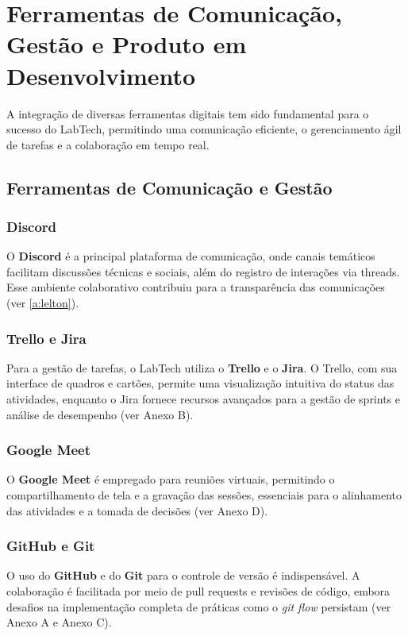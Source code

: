 
\chapter{Ferramentas de Comunicação, Gestão e Produto em Desenvolvimento}
\label{chap:ferramentas_produto}

A integração de diversas ferramentas digitais tem sido fundamental para o sucesso do LabTech, permitindo uma comunicação eficiente, o gerenciamento ágil de tarefas e a colaboração em tempo real.

\section{Ferramentas de Comunicação e Gestão}
\subsection{Discord}
O \textbf{Discord} é a principal plataforma de comunicação, onde canais temáticos facilitam discussões técnicas e sociais, além do registro de interações via threads. Esse ambiente colaborativo contribuiu para a transparência das comunicações (ver \ref{a:lelton}).

\subsection{Trello e Jira}
Para a gestão de tarefas, o LabTech utiliza o \textbf{Trello} e o \textbf{Jira}. O Trello, com sua interface de quadros e cartões, permite uma visualização intuitiva do status das atividades, enquanto o Jira fornece recursos avançados para a gestão de sprints e análise de desempenho (ver Anexo B).

\subsection{Google Meet}
O \textbf{Google Meet} é empregado para reuniões virtuais, permitindo o compartilhamento de tela e a gravação das sessões, essenciais para o alinhamento das atividades e a tomada de decisões (ver Anexo D).

\subsection{GitHub e Git}
O uso do \textbf{GitHub} e do \textbf{Git} para o controle de versão é indispensável. A colaboração é facilitada por meio de pull requests e revisões de código, embora desafios na implementação completa de práticas como o \textit{git flow} persistam (ver Anexo A e Anexo C).

